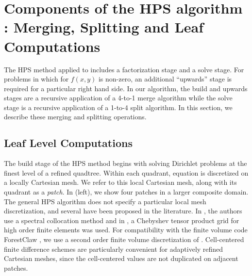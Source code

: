 \section{Components of the HPS algorithm : Merging, Splitting and Leaf Computations}
\label{sec:quadtree}
The HPS method applied to  includes a factorization stage and a solve stage. For problems in which for $f(x,y)$ is non-zero, an additional ``upwards'' stage is required for a particular right hand side.  In our algorithm, the build and upwards stages are a recursive application of a 4-to-1 merge algorithm while the solve stage is a recursive application of a 1-to-4 split algorithm.  In this section, we describe these merging and splitting operations.


\subsection{Leaf Level Computations}
\label{sub:leaf_level_computations}

The build stage of the HPS method begins with solving Dirichlet problems at the finest level of a refined quadtree.  Within each quadrant, equation  is discretized on a locally Cartesian mesh.  We refer to this local Cartesian mesh, along with its quadrant as a {\em patch}.  In  (left), we show four patches in a larger composite domain. The general HPS algorithm does not specify a particular local mesh discretization, and several have been proposed in the literature.  In \cite{gillman2014direct}, the authors use a spectral collocation method and in \cite{fortunato2020ultraspherical}, a Chebyshev tensor product grid for high order finite elements was used. For compatibility with the finite volume code ForestClaw \cite{calhoun2017forestclaw}, we use a second order finite volume discretization of . Cell-centered finite difference schemes are particularly convenient for adaptively refined Cartesian meshes, since the cell-centered values are not duplicated on adjacent patches.

